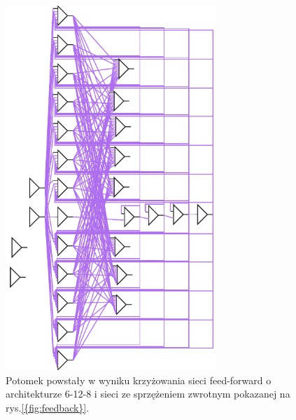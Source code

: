 \begin{enumerate}
\begin{itemize}
		\begin{figure}[h]
		\centering
		\includegraphics[width=0.7\textwidth]{dane/part2/zad3/dziecko_1111_6-12-8}
		\caption{Potomek powstały w wyniku krzyżowania sieci feed-forward o architekturze 6-12-8 i sieci ze sprzężeniem zwrotnym pokazanej na rys.\ref{{fig:feedback}}.\label{fig:dziecko_1111_6-12-8}}
		\end{figure}			
		
		
	\end{itemize}
\end{enumerate}